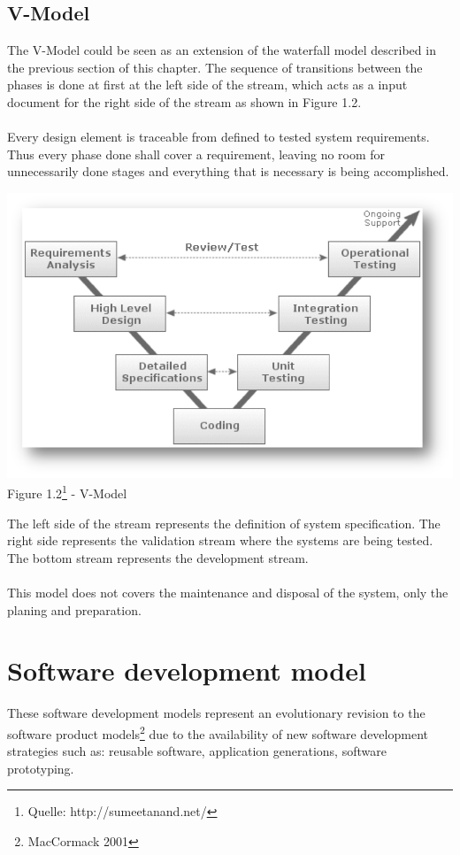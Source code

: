\subsection{V-Model}
The V-Model could be seen as an extension of the waterfall model described in the previous section of this chapter. The sequence of transitions between the phases is done at first at the left side of the stream, which acts as a input document for the right side of the stream as shown in Figure 1.2.\\ \\
Every design element is traceable from defined to tested system requirements. Thus every phase done shall cover a requirement, leaving no room for unnecessarily done stages and everything that is necessary is being accomplished. 
\begin{center}
\includegraphics[scale=0.75]{Images/V_Model_model.png}\\
Figure 1.2\footnote{Quelle: http://sumeetanand.net/} - V-Model
\end{center}
The left side of the stream represents the  definition of system specification. The right side represents the validation stream where the systems are being tested. The bottom stream represents the development stream.\\ \\
This model does not covers the maintenance and disposal of the system, only the planing and preparation.
\section{Software development model} 
These software development models represent an evolutionary revision to the software product models\footnote{MacCormack 2001} due to the availability of new software development strategies such as: reusable software, application generations, software prototyping.\\
